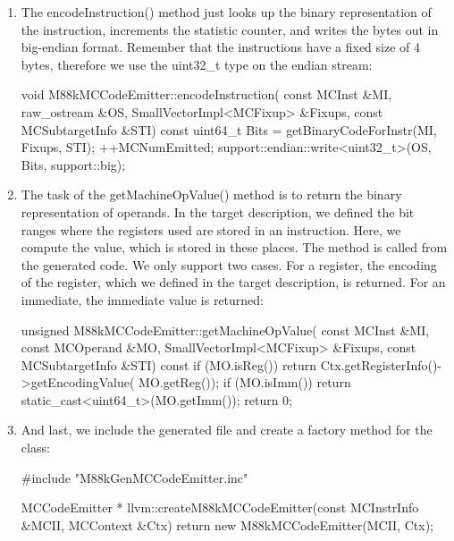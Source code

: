 \begin{enumerate}
\item
The encodeInstruction() method just looks up the binary representation of the instruction, increments the statistic counter, and writes the bytes out in big-endian format. Remember that the instructions have a fixed size of 4 bytes, therefore we use the uint32\_t type on the endian stream:

\begin{cpp}
void M88kMCCodeEmitter::encodeInstruction(
        const MCInst &MI, raw_ostream &OS,
        SmallVectorImpl<MCFixup> &Fixups,
        const MCSubtargetInfo &STI) const {
    uint64_t Bits =
        getBinaryCodeForInstr(MI, Fixups, STI);
    ++MCNumEmitted;
    support::endian::write<uint32_t>(OS, Bits,
                                     support::big);
}
\end{cpp}

\item
The task of the getMachineOpValue() method is to return the binary representation of operands. In the target description, we defined the bit ranges where the registers used are stored in an instruction. Here, we compute the value, which is stored in these places. The method is called from the generated code. We only support two cases. For a register, the encoding of the register, which we defined in the target description, is returned. For an immediate, the immediate value is returned:

\begin{cpp}
unsigned M88kMCCodeEmitter::getMachineOpValue(
        const MCInst &MI, const MCOperand &MO,
        SmallVectorImpl<MCFixup> &Fixups,
        const MCSubtargetInfo &STI) const {
    if (MO.isReg())
        return Ctx.getRegisterInfo()->getEncodingValue(
            MO.getReg());
    if (MO.isImm())
        return static_cast<uint64_t>(MO.getImm());
    return 0;
}
\end{cpp}

\item
And last, we include the generated file and create a factory method for the class:

\begin{cpp}
#include "M88kGenMCCodeEmitter.inc"

MCCodeEmitter *
llvm::createM88kMCCodeEmitter(const MCInstrInfo &MCII,
                              MCContext &Ctx) {
    return new M88kMCCodeEmitter(MCII, Ctx);
}
\end{cpp}
\end{enumerate}



